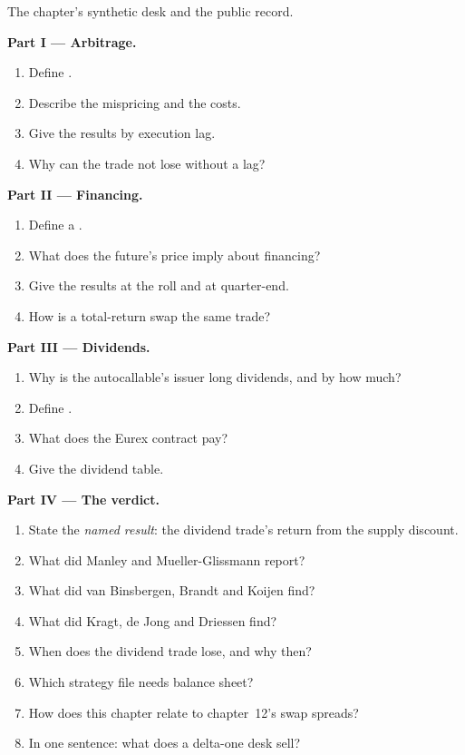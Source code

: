 \begin{problem}\label{pb:s2:delta-one-and-dividends:1}
The chapter's synthetic desk and the public record.

\medskip\noindent\textbf{Part I --- Arbitrage.}
\begin{enumerate}
\item Define .
\item Describe the mispricing and the costs.
\item Give the results by execution lag.
\item Why can the trade not lose without a lag?
\end{enumerate}

\medskip\noindent\textbf{Part II --- Financing.}
\begin{enumerate}[resume]
\item Define a .
\item What does the future's price imply about financing?
\item Give the results at the roll and at quarter-end.
\item How is a total-return swap the same trade?
\end{enumerate}

\medskip\noindent\textbf{Part III --- Dividends.}
\begin{enumerate}[resume]
\item Why is the autocallable's issuer long dividends, and by how much?
\item Define .
\item What does the Eurex contract pay?
\item Give the dividend table.
\end{enumerate}

\medskip\noindent\textbf{Part IV --- The verdict.}
\begin{enumerate}[resume]
\item State the \emph{named result}: the dividend trade's return from the supply discount.
\item What did Manley and Mueller-Glissmann report?
\item What did van Binsbergen, Brandt and Koijen find?
\item What did Kragt, de Jong and Driessen find?
\item When does the dividend trade lose, and why then?
\item Which strategy file needs balance sheet?
\item How does this chapter relate to chapter~12's swap spreads?
\item In one sentence: what does a delta-one desk sell?
\end{enumerate}
\end{problem}

